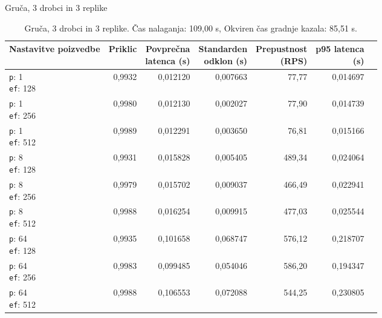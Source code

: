 \begin{table}[htbp]
  \centering
\small
  \caption{Gruča, 3 drobci in 3 replike}
  \label{tab:cluster-2cpu-4ram:tenant:s3-r3:qdrant-dipl-sharding-3-shards-3-replica-tenant-m-16-ef-128-random-768-100-tenants-extended-upload-2026-08-19-11-03-15.json}
  \begin{tabularx}{\textwidth}{Xrrrrrr}
    \toprule
    Nastavitve poizvedbe & Priklic & \makecell{Povprečna\\latenca (s)} & \makecell{Standarden\\odklon (s)} & \makecell{Prepustnost\\(RPS)} & \makecell{p95 latenca\\(s)}  \\
    \midrule
    \makecell{\texttt{p}: 1\\\texttt{ef}: 128} & 0,9932 & 0,012120 & 0,007663 & 77,77 & 0,014697 \\
    \makecell{\texttt{p}: 1\\\texttt{ef}: 256} & 0,9980 & 0,012130 & 0,002027 & 77,90 & 0,014739 \\
    \makecell{\texttt{p}: 1\\\texttt{ef}: 512} & 0,9989 & 0,012291 & 0,003650 & 76,81 & 0,015166 \\
    \makecell{\texttt{p}: 8\\\texttt{ef}: 128} & 0,9931 & 0,015828 & 0,005405 & 489,34 & 0,024064 \\
    \makecell{\texttt{p}: 8\\\texttt{ef}: 256} & 0,9979 & 0,015702 & 0,009037 & 466,49 & 0,022941 \\
    \makecell{\texttt{p}: 8\\\texttt{ef}: 512} & 0,9988 & 0,016254 & 0,009915 & 477,03 & 0,025544 \\
    \makecell{\texttt{p}: 64\\\texttt{ef}: 128} & 0,9935 & 0,101658 & 0,068747 & 576,12 & 0,218707 \\
    \makecell{\texttt{p}: 64\\\texttt{ef}: 256} & 0,9983 & 0,099485 & 0,054046 & 586,20 & 0,194347 \\
    \makecell{\texttt{p}: 64\\\texttt{ef}: 512} & 0,9988 & 0,106553 & 0,072088 & 544,25 & 0,230805 \\
    \bottomrule
  \end{tabularx}
\caption* {Gruča, 3 drobci in 3 replike. Čas nalaganja: 109,00 s, Okviren čas gradnje kazala: 85,51 s.}\end{table}

